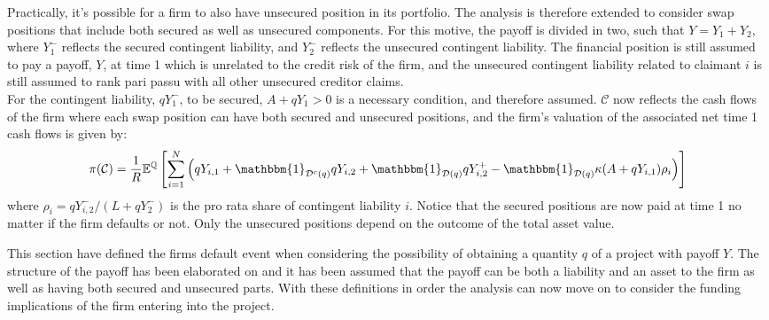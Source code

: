 \documentclass[../main.tex]{subfiles}
\begin{document}
        Practically, it's possible for a firm to also have unsecured position in its portfolio.
        The analysis is therefore extended to consider swap positions that include both secured as well as unsecured components.
        For this motive, the payoff is divided in two, such that $Y=Y_1 + Y_2$, where $Y_1^{-}$ reflects the secured contingent liability, and $Y_2^{-}$ reflects the unsecured contingent liability.
        The financial position is still assumed to pay a payoff, $Y$, at time 1 which is unrelated to the credit risk of the firm, and the unsecured contingent liability related to claimant $i$ is still assumed to rank pari passu with all other unsecured creditor claims.\\
        For the contingent liability, $qY_1^{-}$, to be secured, $A+qY_1 > 0$ is a necessary condition, and therefore assumed.
        $\mathcal{C}$ now reflects the cash flows of the firm where each swap position can have both secured and unsecured positions, and the firm's valuation of the associated net time 1 cash flows is given by:
        \begin{equation}
            \pi(\mathcal{C}) = \discountfactor \mathbb{E}^{\mathbb{Q}}\left[
            \sum_{i=1}^{N} \left(
                q Y_{i,1}
                + \mathbbm{1}_{\mathcal{D}^{c}(q)} qY_{i,2}
                + \mathbbm{1}_{\mathcal{D}(q)} qY_{i,2}^{+}
                - \mathbbm{1}_{\mathcal{D}(q)} \kappa (A + qY_{i,1}) \rho_{i}
            \right)\right]
        \end{equation}
        where $\rho_{i} = qY_{i,2}^{-}/(L + qY_{2}^{-})$ is the pro rata share of contingent liability $i$. Notice that the secured positions are now paid at time 1 no matter if the firm defaults or not. Only the unsecured positions depend on the outcome of the total asset value.

        This section have defined the firms default event when considering the possibility
        of obtaining a quantity $q$ of a project with payoff $Y$.
        The structure of the payoff has been elaborated on
        and it has been assumed that the payoff can be both a liability and an asset to the firm
        as well as having both secured and unsecured parts.
        With these definitions in order the analysis can now move on to consider the
        funding implications of the firm entering into the project.
        
\end{document}
